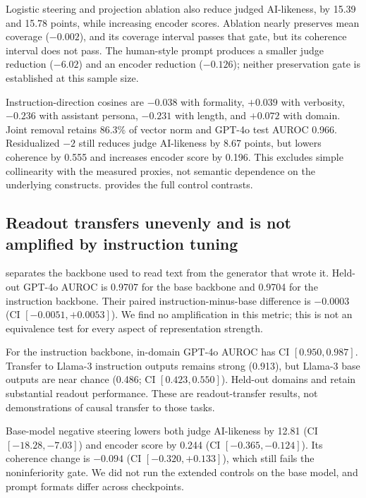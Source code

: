 Logistic steering and projection ablation also reduce judged AI-likeness, by 15.39 and 15.78 points, while increasing encoder scores. Ablation nearly preserves mean coverage ($-0.002$), and its coverage interval passes that gate, but its coherence interval does not pass. The human-style prompt produces a smaller judge reduction ($-6.02$) and an encoder reduction ($-0.126$); neither preservation gate is established at this sample size.

Instruction-direction cosines are $-0.038$ with formality, $+0.039$ with verbosity, $-0.236$ with assistant persona, $-0.231$ with length, and $+0.072$ with domain. Joint removal retains 86.3\% of vector norm and GPT-4o test AUROC 0.966. Residualized $-2$ still reduces judge AI-likeness by 8.67 points, but lowers coherence by 0.555 and increases encoder score by 0.196. This excludes simple collinearity with the measured proxies, not semantic dependence on the underlying constructs.  provides the full control contrasts.

\subsection{Readout transfers unevenly and is not amplified by instruction tuning}
 separates the backbone used to read text from the generator that wrote it. Held-out GPT-4o AUROC is 0.9707 for the base backbone and 0.9704 for the instruction backbone. Their paired instruction-minus-base difference is $-0.0003$ (CI $[-0.0051,+0.0053]$). We find no amplification in this metric; this is not an equivalence test for every aspect of representation strength.


For the instruction backbone, in-domain GPT-4o AUROC has CI $[0.950,0.987]$. Transfer to Llama-3 instruction outputs remains strong (0.913), but Llama-3 base outputs are near chance (0.486; CI $[0.423,0.550]$). Held-out domains and \hcthree retain substantial readout performance. These are readout-transfer results, not demonstrations of causal transfer to those tasks.

Base-model negative steering lowers both judge AI-likeness by 12.81 (CI $[-18.28,-7.03]$) and encoder score by 0.244 (CI $[-0.365,-0.124]$). Its coherence change is $-0.094$ (CI $[-0.320,+0.133]$), which still fails the noninferiority gate. We did not run the extended controls on the base model, and prompt formats differ across checkpoints.

